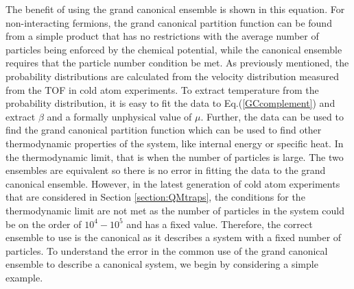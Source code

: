 The benefit of using the grand canonical ensemble is shown in this equation. 
For non-interacting fermions, the grand canonical partition function can be found from a simple product that has no restrictions with the average number of particles being enforced by the chemical potential, while the canonical ensemble requires that the particle number condition be met. 
As previously mentioned, the probability distributions are calculated from the velocity distribution measured from the TOF in cold atom experiments. To extract temperature from the probability distribution, it is easy to fit the data to Eq.\@ (\ref{GCcomplement}) and extract $\beta$ and a formally unphysical value of $\mu$. Further, the data can be used to find the grand canonical partition function which can be used to find other thermodynamic properties of the system, like internal energy or specific heat. In the thermodynamic limit, that is when the number of particles is large. The two ensembles are equivalent so there is no error in fitting the data to the grand canonical ensemble. 
However, in the latest generation of cold atom experiments that are considered in Section \ref{section:QMtraps}, the conditions for the thermodynamic limit are not met as the number of particles in the system could be on the order of $10^{4}-10^{5}$ and has a fixed value. Therefore, the correct ensemble to use is the canonical as it describes a system with a fixed number of particles. To understand the error in the common use of the grand canonical ensemble to describe a canonical system, we begin by considering a simple example. 


